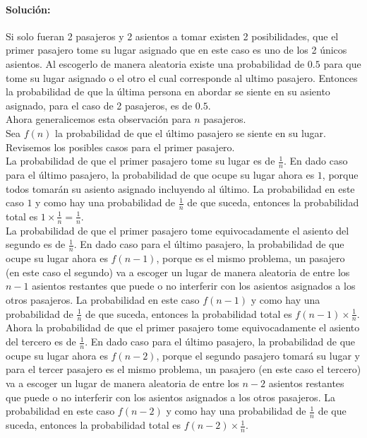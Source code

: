 \documentclass[12pt]{article}
\begin{document}
\paragraph{Solución: }
Si solo fueran 2 pasajeros y 2 asientos a tomar existen 2 posibilidades, que el primer pasajero tome su lugar asignado que en este caso es uno de los 2 únicos asientos. Al escogerlo de manera aleatoria existe una probabilidad de $0.5$ para que tome su lugar asignado o el otro el cual corresponde al ultimo pasajero. Entonces la probabilidad de que la última persona en abordar se siente en su asiento asignado, para el caso de 2 pasajeros, es de $0.5$.\\
Ahora generalicemos esta observación para $n$ pasajeros.\\
Sea $f(n)$ la probabilidad de que el último pasajero se siente en su lugar.\\
Revisemos los posibles casos para el primer pasajero.\\
La probabilidad de que el primer pasajero tome su lugar es de $\frac{1}{n}$. En dado caso para el último pasajero, la probabilidad de que ocupe su lugar ahora es $1$, porque todos tomarán su asiento asignado incluyendo al último. La probabilidad en este caso $1$ y como hay una probabilidad de $\frac{1}{n}$ de que suceda, entonces la probabilidad total es $1\times \frac{1}{n}=\frac{1}{n}$.\\

La probabilidad de que el primer pasajero tome equivocadamente el asiento del segundo es de $\frac{1}{n}$. En dado caso para el último pasajero, la probabilidad de que ocupe su lugar ahora es $f(n-1)$, porque es el mismo problema, un pasajero (en este caso el segundo) va a escoger un lugar de manera aleatoria de entre los $n-1$ asientos restantes que puede o no interferir con los asientos asignados a los otros pasajeros. La probabilidad en este caso $f(n-1)$ y como hay una probabilidad de $\frac{1}{n}$ de que suceda, entonces la probabilidad total es $f(n-1)\times \frac{1}{n}$.\\

Ahora la probabilidad de que el primer pasajero tome equivocadamente el asiento del tercero es de $\frac{1}{n}$. En dado caso para el último pasajero, la probabilidad de que ocupe su lugar ahora es $f(n-2)$, porque el segundo pasajero tomará su lugar y para el tercer pasajero es el mismo problema, un pasajero (en este caso el tercero) va a escoger un lugar de manera aleatoria de entre los $n-2$ asientos restantes que puede o no interferir con los asientos asignados a los otros pasajeros. La probabilidad en este caso $f(n-2)$ y como hay una probabilidad de $\frac{1}{n}$ de que suceda, entonces la probabilidad total es $f(n-2)\times \frac{1}{n}$.\\
\end{document}
